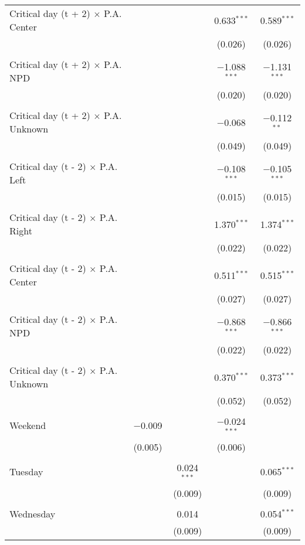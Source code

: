 \documentclass[
]{article}
\begin{document}
\begin{table}[!htbp]
{\begin{tabular}{@{\extracolsep{5pt}}lcccc}
 Critical day (t + 2) $\times$ P.A. Center &  &  & 0.633$^{***}$ & 0.589$^{***}$ \\ 
  &  &  & (0.026) & (0.026) \\ 
  & & & & \\ 
 Critical day (t + 2) $\times$ P.A. NPD &  &  & $-$1.088$^{***}$ & $-$1.131$^{***}$ \\ 
  &  &  & (0.020) & (0.020) \\ 
  & & & & \\ 
 Critical day (t + 2) $\times$ P.A. Unknown &  &  & $-$0.068 & $-$0.112$^{**}$ \\ 
  &  &  & (0.049) & (0.049) \\ 
  & & & & \\ 
 Critical day (t - 2) $\times$ P.A. Left &  &  & $-$0.108$^{***}$ & $-$0.105$^{***}$ \\ 
  &  &  & (0.015) & (0.015) \\ 
  & & & & \\ 
 Critical day (t - 2) $\times$ P.A. Right &  &  & 1.370$^{***}$ & 1.374$^{***}$ \\ 
  &  &  & (0.022) & (0.022) \\ 
  & & & & \\ 
 Critical day (t - 2) $\times$ P.A. Center &  &  & 0.511$^{***}$ & 0.515$^{***}$ \\ 
  &  &  & (0.027) & (0.027) \\ 
  & & & & \\ 
 Critical day (t - 2) $\times$ P.A. NPD &  &  & $-$0.868$^{***}$ & $-$0.866$^{***}$ \\ 
  &  &  & (0.022) & (0.022) \\ 
  & & & & \\ 
 Critical day (t - 2) $\times$ P.A. Unknown &  &  & 0.370$^{***}$ & 0.373$^{***}$ \\ 
  &  &  & (0.052) & (0.052) \\ 
  & & & & \\ 
 Weekend & $-$0.009 &  & $-$0.024$^{***}$ &  \\ 
  & (0.005) &  & (0.006) &  \\ 
  & & & & \\ 
 Tuesday &  & 0.024$^{***}$ &  & 0.065$^{***}$ \\ 
  &  & (0.009) &  & (0.009) \\ 
  & & & & \\ 
 Wednesday &  & 0.014 &  & 0.054$^{***}$ \\ 
  &  & (0.009) &  & (0.009) \\ 

\end{tabular}}
\end{table}
\end{document}
